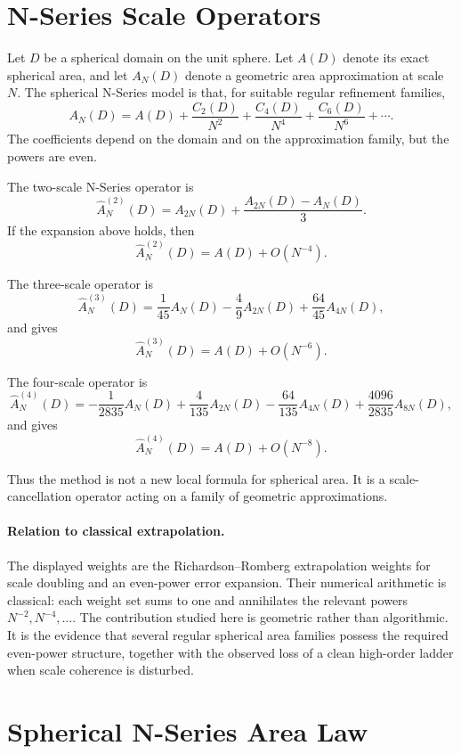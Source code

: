 \documentclass[11pt]{article}
\begin{document}
\section{N-Series Scale Operators}

Let $D$ be a spherical domain on the unit sphere.  Let $A(D)$ denote its
exact spherical area, and let $A_N(D)$ denote a geometric area approximation
at scale $N$.  The spherical N-Series model is that, for suitable regular
refinement families,
\[
  A_N(D)
  =
  A(D)
  +
  \frac{C_2(D)}{N^2}
  +
  \frac{C_4(D)}{N^4}
  +
  \frac{C_6(D)}{N^6}
  +
  \cdots .
\]
The coefficients depend on the domain and on the approximation family, but
the powers are even.

The two-scale N-Series operator is
\[
  \widehat{A}^{(2)}_N(D)
  =
  A_{2N}(D)
  +
  \frac{A_{2N}(D)-A_N(D)}{3}.
\]
If the expansion above holds, then
\[
  \widehat{A}^{(2)}_N(D)
  =
  A(D)+O(N^{-4}).
\]

The three-scale operator is
\[
  \widehat{A}^{(3)}_N(D)
  =
  \frac{1}{45}A_N(D)
  -
  \frac{4}{9}A_{2N}(D)
  +
  \frac{64}{45}A_{4N}(D),
\]
and gives
\[
  \widehat{A}^{(3)}_N(D)
  =
  A(D)+O(N^{-6}).
\]

The four-scale operator is
\[
  \widehat{A}^{(4)}_N(D)
  =
  -\frac{1}{2835}A_N(D)
  +
  \frac{4}{135}A_{2N}(D)
  -
  \frac{64}{135}A_{4N}(D)
  +
  \frac{4096}{2835}A_{8N}(D),
\]
and gives
\[
  \widehat{A}^{(4)}_N(D)
  =
  A(D)+O(N^{-8}).
\]

Thus the method is not a new local formula for spherical area.  It is a
scale-cancellation operator acting on a family of geometric approximations.


\paragraph{Relation to classical extrapolation.}
The displayed weights are the Richardson--Romberg extrapolation weights for
scale doubling and an even-power error expansion.  Their numerical arithmetic
is classical: each weight set sums to one and annihilates the relevant powers
$N^{-2},N^{-4},\ldots$.  The contribution studied here is geometric rather
than algorithmic.  It is the evidence that several regular spherical area
families possess the required even-power structure, together with the observed
loss of a clean high-order ladder when scale coherence is disturbed.

\section{Spherical N-Series Area Law}
\end{document}
